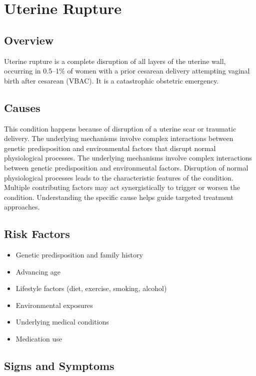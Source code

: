 \chapter{Uterine Rupture}
\label{sec:Uterine Rupture}

\section{Overview}
Uterine rupture is a complete disruption of all layers of the uterine wall, occurring in 0.5--1\% of women with a prior cesarean delivery attempting vaginal birth after cesarean (VBAC). It is a catastrophic obstetric emergency.
\section{Causes}
This condition happens because of disruption of a uterine scar or traumatic delivery. The underlying mechanisms involve complex interactions between genetic predisposition and environmental factors that disrupt normal physiological processes. The underlying mechanisms involve complex interactions between genetic predisposition and environmental factors. Disruption of normal physiological processes leads to the characteristic features of the condition. Multiple contributing factors may act synergistically to trigger or worsen the condition. Understanding the specific cause helps guide targeted treatment approaches.
\section{Risk Factors}


\begin{itemize}[noitemsep]
  \item Genetic predisposition and family history
  \item Advancing age
  \item Lifestyle factors (diet, exercise, smoking, alcohol)
  \item Environmental exposures
  \item Underlying medical conditions
  \item Medication use
\end{itemize}
\section{Signs and Symptoms}


